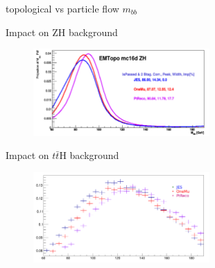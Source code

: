 \begin{frame}{topological vs particle flow $m_{bb}$}
\begin{figure}
    \centering
\end{figure}
\end{frame}

\begin{frame}{Impact on ZH background}
    \begin{figure}
        \centering
        \includegraphics[width=0.6\textwidth]{BackUp/Part3/Img/ZH_b_jets_cal.png}
    \end{figure}
\end{frame}

\begin{frame}{Impact on $t\bar{t}$H background}
    \begin{figure}
        \centering
        \includegraphics[width=0.6\textwidth]{BackUp/Part3/Img/ttH_b_jets_cal.png}
    \end{figure}
\end{frame}


